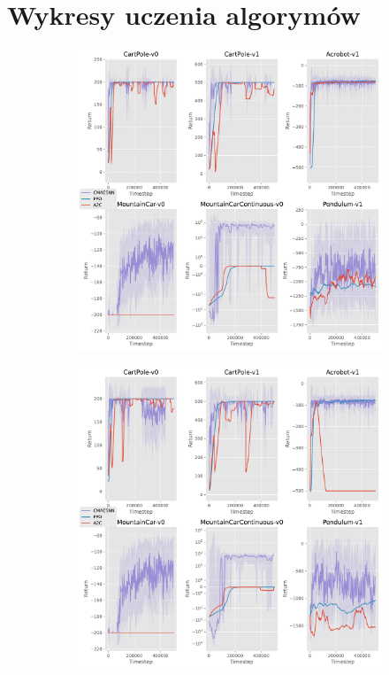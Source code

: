 \documentclass[12pt,a4paper]{article}
\begin{document}
\pagebreak
\appendix
\section{Wykresy uczenia algorymów}\label{appendix:training}

\begin{figure}[ht!]
  \centering
  \begin{subfigure}[ht!]{0.35\textwidth}
    \includegraphics[width=\textwidth]{../plotting/plots/plot_all0.pdf}
    \caption{}
  \end{subfigure}
  \hspace{0.05\textwidth}
  \begin{subfigure}[ht!]{0.35\textwidth}
    \includegraphics[width=\textwidth]{../plotting/plots/plot_all1.pdf}
    \caption{}
  \end{subfigure}


\end{figure}
\end{document}
